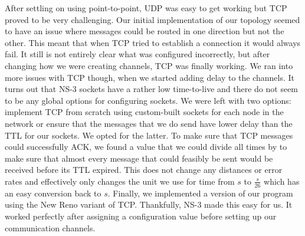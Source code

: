 \documentclass[a4paper,12pt]{article}
\begin{document}
After settling on using point-to-point, UDP was easy to get working but TCP
proved to be very challenging. Our initial implementation of our topology seemed
to have an issue where messages could be routed in one direction but not the
other. This meant that when TCP tried to establish a connection it would always
fail. It still is not entirely clear what was configured incorrectly, but after
changing how we were creating channels, TCP was finally working. We ran into
more issues with TCP though, when we started adding delay to the channels. It
turns out that NS-3 sockets have a rather low time-to-live and there do not seem
to be any global options for configuring sockets. We were left with two options:
implement TCP from scratch using custom-built sockets for each node in the
network or ensure that the messages that we do send have lower delay than the
TTL for our sockets. We opted for the latter. To make sure that TCP messages
could successfully ACK, we found a value that we could divide all times by to
make sure that almost every message that could feasibly be sent would be
received before its TTL expired. This does not change any distances or error
rates and effectively only changes the unit we use for time from $s$ to
$\frac{s}{26}$ which has an easy conversion back to $s$. Finally, we implemented
a version of our program using the New Reno variant of TCP. Thankfully, NS-3
made this easy for us. It worked perfectly after assigning a configuration value
before setting up our communication channels.

\printbibliography{}
\end{document}
